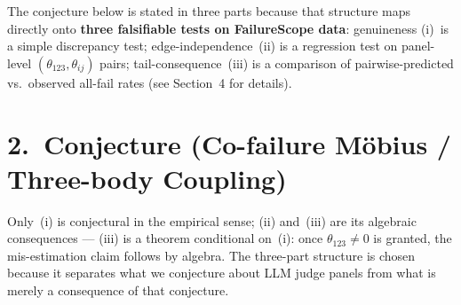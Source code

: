 \documentclass[11pt,a4paper]{article}
\theoremstyle{conjstyle}
\theoremstyle{remark}
\begin{document}
The conjecture below is stated in three parts because that structure maps
directly onto \textbf{three falsifiable tests on FailureScope data}:
genuineness (i)~is a simple discrepancy test; edge-independence~(ii) is a
regression test on panel-level $(\theta_{123}, \theta_{ij})$ pairs;
tail-consequence~(iii) is a comparison of pairwise-predicted vs.\ observed
all-fail rates (see Section~4 for details).

\section*{2.\ Conjecture (Co-failure M\"{o}bius / Three-body Coupling)}

Only~(i) is conjectural in the empirical sense; (ii) and~(iii) are its algebraic
consequences --- (iii) is a theorem conditional on~(i): once $\theta_{123} \ne 0$
is granted, the mis-estimation claim follows by algebra.
The three-part structure is chosen because it separates what we conjecture about
LLM judge panels from what is merely a consequence of that conjecture.
\end{document}
